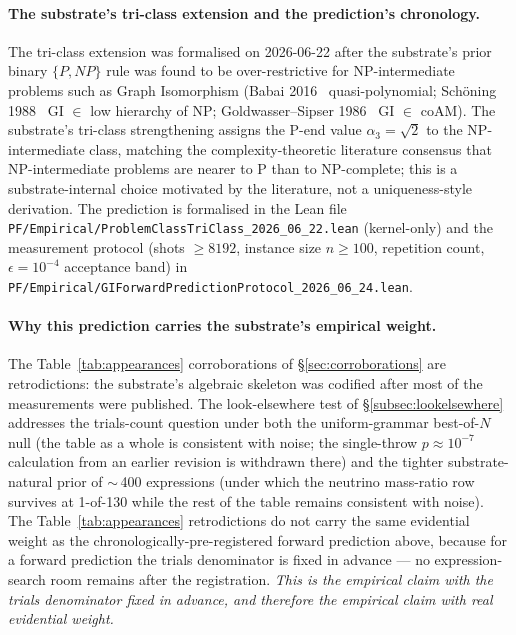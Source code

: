 \documentclass[11pt,a4paper]{amsart}
\theoremstyle{plain}
\theoremstyle{definition}
\begin{document}
\paragraph{The substrate's tri-class extension and the prediction's chronology.} The tri-class extension was formalised on 2026-06-22 after the substrate's prior binary $\{P, NP\}$ rule was found to be over-restrictive for NP-intermediate problems such as Graph Isomorphism (Babai 2016~\cite{babai2016} quasi-polynomial; Sch\"oning 1988~\cite{schoning1988} GI $\in$ low hierarchy of NP; Goldwasser--Sipser 1986~\cite{goldwasser1986} GI $\in$ coAM). The substrate's tri-class strengthening assigns the P-end value $\alpha_3 = \sqrt{2}$ to the NP-intermediate class, matching the complexity-theoretic literature consensus that NP-intermediate problems are nearer to P than to NP-complete; this is a substrate-internal choice motivated by the literature, not a uniqueness-style derivation. The prediction is formalised in the Lean file \texttt{PF/Empirical/ProblemClassTriClass\_2026\_06\_22.lean} (kernel-only) and the measurement protocol (shots $\geq 8192$, instance size $n \geq 100$, repetition count, $\epsilon = 10^{-4}$ acceptance band) in \texttt{PF/Empirical/GIForwardPredictionProtocol\_2026\_06\_24.lean}.

\paragraph{Why this prediction carries the substrate's empirical weight.} The Table~\ref{tab:appearances} corroborations of \S\ref{sec:corroborations} are retrodictions: the substrate's algebraic skeleton was codified after most of the measurements were published. The look-elsewhere test of \S\ref{subsec:lookelsewhere} addresses the trials-count question under both the uniform-grammar best-of-$N$ null (the table as a whole is consistent with noise; the single-throw $p \approx 10^{-7}$ calculation from an earlier revision is withdrawn there) and the tighter substrate-natural prior of $\sim$\,400 expressions (under which the neutrino mass-ratio row survives at 1-of-130 while the rest of the table remains consistent with noise). The Table~\ref{tab:appearances} retrodictions do not carry the same evidential weight as the chronologically-pre-registered forward prediction above, because for a forward prediction the trials denominator is fixed in advance --- no expression-search room remains after the registration. \emph{This is the empirical claim with the trials denominator fixed in advance, and therefore the empirical claim with real evidential weight.}
\end{document}
